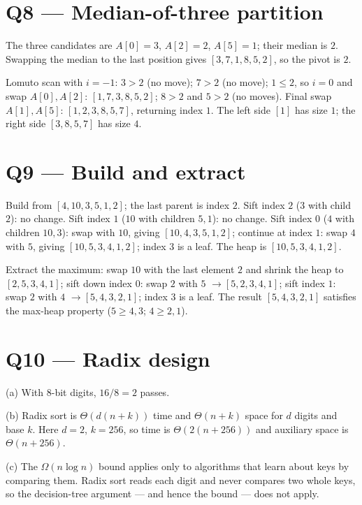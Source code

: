 \documentclass[11pt]{article}
\begin{document}
\section*{Q8 --- Median-of-three partition}

The three candidates are $A[0]=3$, $A[2]=2$, $A[5]=1$; their median is $2$. Swapping the median to the last position gives $[3,7,1,8,5,2]$, so the pivot is $2$.

Lomuto scan with $i=-1$: $3>2$ (no move); $7>2$ (no move); $1\le2$, so $i=0$ and swap $A[0],A[2]$: $[1,7,3,8,5,2]$; $8>2$ and $5>2$ (no moves). Final swap $A[1],A[5]$: $[1,2,3,8,5,7]$, returning index $1$. The left side $[1]$ has size $1$; the right side $[3,8,5,7]$ has size $4$.

\section*{Q9 --- Build and extract}

Build from $[4,10,3,5,1,2]$; the last parent is index $2$. Sift index $2$ ($3$ with child $2$): no change. Sift index $1$ ($10$ with children $5,1$): no change. Sift index $0$ ($4$ with children $10,3$): swap with $10$, giving $[10,4,3,5,1,2]$; continue at index $1$: swap $4$ with $5$, giving $[10,5,3,4,1,2]$; index $3$ is a leaf. The heap is $[10,5,3,4,1,2]$.

Extract the maximum: swap $10$ with the last element $2$ and shrink the heap to $[2,5,3,4,1]$; sift down index $0$: swap $2$ with $5$ $\to[5,2,3,4,1]$; sift index $1$: swap $2$ with $4$ $\to[5,4,3,2,1]$; index $3$ is a leaf. The result $[5,4,3,2,1]$ satisfies the max-heap property ($5\ge4,3$; $4\ge2,1$).

\section*{Q10 --- Radix design}

(a) With $8$-bit digits, $16/8 = 2$ passes.

(b) Radix sort is $\Theta(d(n+k))$ time and $\Theta(n+k)$ space for $d$ digits and base $k$. Here $d=2$, $k=256$, so time is $\Theta(2(n+256))$ and auxiliary space is $\Theta(n+256)$.

(c) The $\Omega(n\log n)$ bound applies only to algorithms that learn about keys by comparing them. Radix sort reads each digit and never compares two whole keys, so the decision-tree argument --- and hence the bound --- does not apply.
\end{document}
